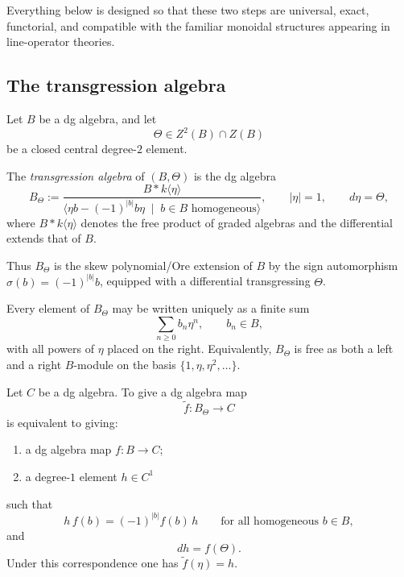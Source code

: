 Everything below is designed so that these two steps are universal, exact, functorial, and compatible with the familiar monoidal structures appearing in line-operator theories.

\subsection{The transgression algebra}

Let \(B\) be a dg algebra, and let
\[
\Theta\in Z^{2}(B)\cap Z(B)
\]
be a closed central degree-\(2\) element.

\begin{definition}
The \emph{transgression algebra} of \((B,\Theta)\) is the dg algebra
\[
B_{\Theta}
:=
\frac{B * k\langle \eta\rangle}
{\langle \eta b-(-1)^{|b|}b\eta\;\mid\; b\in B \text{ homogeneous}\rangle},
\qquad |\eta|=1,\qquad d\eta=\Theta,
\]
where \(B * k\langle\eta\rangle\) denotes the free product of graded algebras and the differential extends that of \(B\).
\end{definition}

Thus \(B_{\Theta}\) is the skew polynomial/Ore extension of \(B\) by the sign automorphism \(\sigma(b)=(-1)^{|b|}b\), equipped with a differential transgressing \(\Theta\).

\begin{remark}
Every element of \(B_{\Theta}\) may be written uniquely as a finite sum
\[
\sum_{n\geq 0} b_{n}\eta^{n},
\qquad b_{n}\in B,
\]
with all powers of \(\eta\) placed on the right.
Equivalently, \(B_{\Theta}\) is free as both a left and a right \(B\)-module on the basis \(\{1,\eta,\eta^{2},\dots\}\).
\end{remark}

\begin{proposition}
Let \(C\) be a dg algebra.
To give a dg algebra map
\[
\widetilde f:B_{\Theta}\longrightarrow C
\]
is equivalent to giving:
\begin{enumerate}
\item a dg algebra map \(f:B\to C\);
\item a degree-\(1\) element \(h\in C^{1}\)
\end{enumerate}
such that
\[
h\,f(b)=(-1)^{|b|}f(b)\,h
\qquad \text{for all homogeneous } b\in B,
\]
and
\[
dh=f(\Theta).
\]
Under this correspondence one has \(\widetilde f(\eta)=h\).
\end{proposition}

